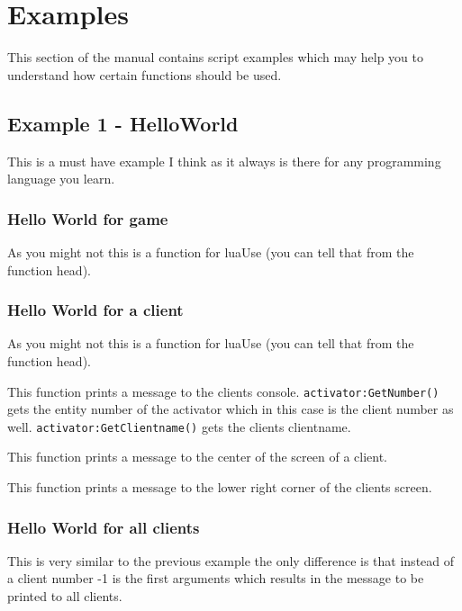 \documentclass{scrreprt}
\begin{document}
\chapter{Examples}
\label{examples}
This section of the manual contains script examples which may help you to understand how certain functions should be used.
\section{Example 1 - HelloWorld}
\label{example1}
This is a must have example I think as it always is there for any programming language you learn.
\subsection{Hello World for game}
\label{example11}

As you might not this is a function for luaUse (you can tell that from the function head).
\subsection{Hello World for a client}
\label{example12}

As you might not this is a function for luaUse (you can tell that from the function head).

This function prints a message to the clients console.
\newline
\lstinline|activator:GetNumber()| gets the entity number of the activator which in this case is the client number as well.
\newline
\lstinline|activator:GetClientname()| gets the clients clientname.

This function prints a message to the center of the screen of a client.

This function prints a message to the lower right corner of the clients screen.
\subsection{Hello World for all clients}
\label{example13}

This is very similar to the previous example the only difference is that instead of a client number -1 is the first arguments which results in the message to be printed to all clients.
\end{document}
